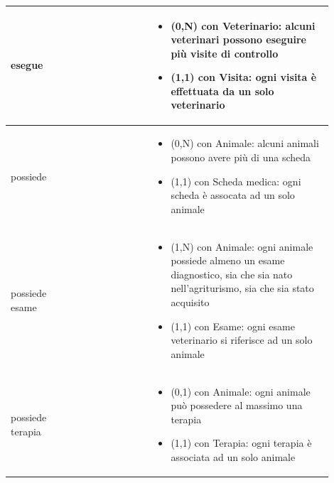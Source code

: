 \documentclass[12pt,a4paper]{article}
\begin{document}
\begin{center}
\begin{longtable}{|p{0.16\linewidth}|p{0.24\linewidth}|p{0.50\linewidth}|}
\hline
esegue 				& \begin{flushleft}\vspace{-15pt}  \end{flushleft}
					& \begin{itemize}
						\setlength{\itemindent}{-1em}
						\vspace{-25pt}
						\setlength\itemsep{-0.25em}
						\item (0,N) con Veterinario: alcuni veterinari possono eseguire più visite di controllo
						\item (1,1) con Visita: ogni visita è effettuata da un solo veterinario
					\end{itemize}\\ 

\hline
possiede 				& \begin{flushleft}\vspace{-15pt}  \end{flushleft}
					& \begin{itemize}
						\setlength{\itemindent}{-1em}
						\vspace{-25pt}
						\setlength\itemsep{-0.25em}
						\item (0,N) con Animale: alcuni animali possono avere più di una scheda
						\item (1,1) con Scheda medica: ogni scheda è assocata ad un solo animale
					\end{itemize}\\ 

\hline
possiede esame 				& \begin{flushleft}\vspace{-15pt}  \end{flushleft}
					& \begin{itemize}
						\setlength{\itemindent}{-1em}
						\vspace{-25pt}
						\setlength\itemsep{-0.25em}
						\item (1,N) con Animale: ogni animale possiede almeno un esame diagnostico, sia che sia nato nell'agriturismo, sia che sia stato acquisito
						\item (1,1) con Esame: ogni esame veterinario si riferisce ad un solo animale
					\end{itemize}\\ 

\hline
possiede terapia 				& \begin{flushleft}\vspace{-15pt} \end{flushleft}
					& \begin{itemize}
						\setlength{\itemindent}{-1em}
						\vspace{-25pt}
						\setlength\itemsep{-0.25em}
						\item (0,1) con Animale: ogni animale può possedere al massimo una terapia
						\item (1,1) con Terapia: ogni terapia è associata ad un solo animale
					\end{itemize}\\ 


\end{longtable}
\end{center}
\end{document}

